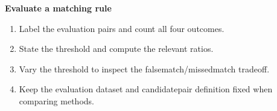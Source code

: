 \documentclass[letterpaper,11pt,english,openany,oneside]{jupyterBook}
\begin{document}
\begin{TextbookBox}
\textbf{Evaluate a matching rule}\par\smallskip
\begin{enumerate}
%
\item {}
\sphinxAtStartPar
Label the evaluation pairs and count all four outcomes.

\item {}
\sphinxAtStartPar
State the threshold and compute the relevant ratios.

\item {}
\sphinxAtStartPar
Vary the threshold to inspect the false\sphinxhyphen{}match/missed\sphinxhyphen{}match tradeoff.

\item {}
\sphinxAtStartPar
Keep the evaluation dataset and candidate\sphinxhyphen{}pair definition fixed when comparing methods.

\end{enumerate}

\end{TextbookBox}
\label{\detokenize{lectures/lecture05/descriptors:ex-lec05-confusion}}
\end{document}

